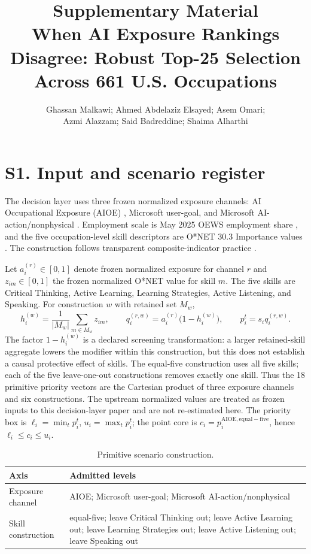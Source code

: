 \documentclass[10pt]{article}
\title{Supplementary Material\\\large When AI Exposure Rankings Disagree: Robust Top-25 Selection Across 661 U.S. Occupations}
\author{Ghassan Malkawi; Ahmed Abdelaziz Elsayed; Asem Omari;\\Azmi Alazzam; Said Badreddine; Shaima Alharthi}
\date{}
\begin{document}
\maketitle\small

\section*{S1. Input and scenario register}
The decision layer uses three frozen normalized exposure channels: AI Occupational Exposure (AIOE) \cite{Sfelten}, Microsoft user-goal, and Microsoft AI-action/nonphysical \cite{Stomlinson}. Employment scale is May 2025 OEWS employment share \cite{Sbls}, and the five occupation-level skill descriptors are O*NET 30.3 Importance values \cite{Sonet}. The construction follows transparent composite-indicator practice \cite{Soecd}.

Let $a_i^{(r)}\in[0,1]$ denote frozen normalized exposure for channel $r$ and $z_{im}\in[0,1]$ the frozen normalized O*NET value for skill $m$. The five skills are Critical Thinking, Active Learning, Learning Strategies, Active Listening, and Speaking. For construction $w$ with retained set $M_w$,
\[
h_i^{(w)}=\frac{1}{|M_w|}\sum_{m\in M_w}z_{im},\qquad q_i^{(r,w)}=a_i^{(r)}\bigl(1-h_i^{(w)}\bigr),\qquad p_i^t=s_iq_i^{(r,w)}.
\]
The factor $1-h_i^{(w)}$ is a declared screening transformation: a larger retained-skill aggregate lowers the modifier within this construction, but this does not establish a causal protective effect of skills. The equal-five construction uses all five skills; each of the five leave-one-out constructions removes exactly one skill. Thus the 18 primitive priority vectors are the Cartesian product of three exposure channels and six constructions. The upstream normalized values are treated as frozen inputs to this decision-layer paper and are not re-estimated here. The priority box is $\ell_i=\min_t p_i^t$, $u_i=\max_t p_i^t$; the point core is $c_i=p_i^{\mathrm{AIOE,equal-five}}$, hence $\ell_i\le c_i\le u_i$.

\begin{table}[h]\centering\small
\caption{Primitive scenario construction.}
\begin{tabular}{p{}p{}}\toprule Axis&Admitted levels\\\midrule
Exposure channel&AIOE; Microsoft user-goal; Microsoft AI-action/nonphysical\\
Skill construction&equal-five; leave Critical Thinking out; leave Active Learning out; leave Learning Strategies out; leave Active Listening out; leave Speaking out\\\bottomrule\end{tabular}
\end{table}
\end{document}
